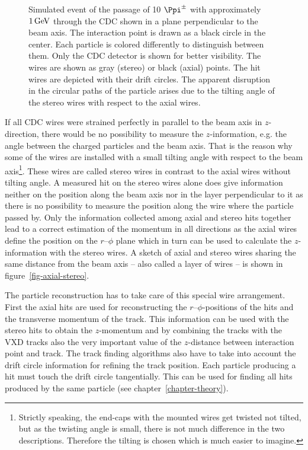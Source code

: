 \begin{figure}
\begin{tikzpicture}
  \end{tikzpicture}
  \caption[Simulated event of the passage of 10 $\Ppi^\pm$ through the CDC.]{Simulated event of the passage of 10 $\Ppi^\pm$ with approximately $\unit[1]{GeV}$ through the CDC shown in a plane perpendicular to the beam axis. The interaction point is drawn as a black circle in the center. Each particle is colored differently to distinguish between them. Only the CDC detector is shown for better visibility. The wires are shown as gray (stereo) or black (axial) points. The hit wires are depicted with their drift circles. The apparent disruption in the circular paths of the particle arises due to the tilting angle of the stereo wires with respect to the axial wires.}
  \label{fig-event-display}
\end{figure}

If all CDC wires were strained perfectly in parallel to the beam axis in $z$-direction, there would be no possibility to measure the $z$-information, e.g. the angle between the charged particles and the beam axis. That is the reason why some of the wires are installed with a small tilting angle with respect to the beam axis\footnote{Strictly speaking, the end-caps with the mounted wires get twisted not tilted, but as the twisting angle is small, there is not much difference in the two descriptions. Therefore the tilting is chosen which is much easier to imagine.}. These wires are called stereo wires in contrast to the axial wires without tilting angle. A measured hit on the stereo wires alone does give information neither on the position along the beam axis nor in the layer perpendicular to it as there is no possibility to measure the position along the wire where the particle passed by. Only the information collected among axial and stereo hits together lead to a correct estimation of the momentum in all directions as the axial wires define the position on the $r$--$\phi$ plane which in turn can be used to calculate the $z$-information with the stereo wires. A sketch of axial and stereo wires sharing the same distance from the beam axis -- also called a layer of wires -- is shown in figure~\ref{fig-axial-stereo}. 

The particle reconstruction has to take care of this special wire arrangement. First the axial hits are used for reconstructing the $r$--$\phi$-positions of the hits and the transverse momentum of the track. This information can be used with the stereo hits to obtain the $z$-momentum and by combining the tracks with the VXD tracks also the very important value of the $z$-distance between interaction point and track. The track finding algorithms also have to take into account the drift circle information for refining the track position. Each particle producing a hit must touch the drift circle tangentially. This can be used for finding all hits produced by the same particle (see chapter~\ref{chapter-theory}).

